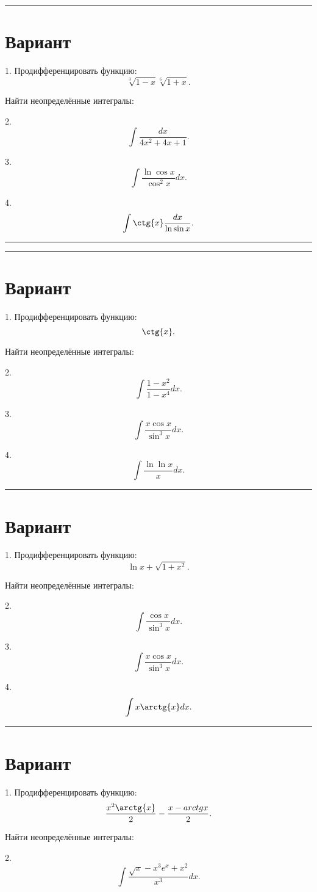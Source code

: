 \documentclass[8pt,a4paper]{scrartcl}
\newcommand{\HRule}{\rule{\linewidth}{0.1mm}}
\begin{document}
\HRule

\section{Вариант} 

1. Продифференцировать функцию:
\[ \sqrt[3]{1 - x} \sqrt[6]{1 + x}. \]

Найти неопределённые интегралы:

2. 
\[ \int\frac{dx}{4 x^2 + 4 x + 1}. \]

3.
\[ \int{\frac{\ln{\cos{x}}}{\cos^2{x}} dx}. \]

4.
\[ \int{\ctg{x} \frac{dx}{\ln{\sin{x}}}}. \]

\HRule

\pagebreak

\HRule

\section{Вариант}
1. Продифференцировать функцию:
\[ \ctg{x}. \]

Найти неопределённые интегралы:

2. 
\[ \int{\frac{1 - x^2}{1 - x^4} dx}. \]

3.
\[ \int{\frac{x \cos{x}}{\sin^3{x}} dx}. \]

4.
\[ \int{\frac{\ln{\ln{x}}}{x} dx}. \]


\HRule

\section{Вариант}
1. Продифференцировать функцию:
\[ \ln{x + \sqrt{1 + x^2}}. \]

Найти неопределённые интегралы:

2. 
\[ \int{\frac{\cos{x}}{\sin^3{x}} dx}. \]

3.
\[ \int{\frac{x \cos{x}}{\sin^3{x}} dx}. \]

4.
\[ \int{x \arctg{x} dx}. \]

\HRule


\section{Вариант}
1. Продифференцировать функцию:
\[ \frac{x^2 \arctg{x}}{2} - \frac{x - arctg{x}}{2}. \]

Найти неопределённые интегралы:

2. 
\[ \int{\frac{\sqrt{x} - x^3 e^x + x^2}{x^3} dx}. \]
\end{document}
